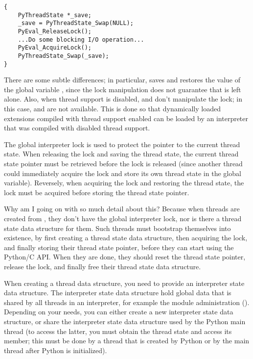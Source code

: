 \documentclass{manual}
\begin{document}
\begin{verbatim}
{
    PyThreadState *_save;
    _save = PyThreadState_Swap(NULL);
    PyEval_ReleaseLock();
    ...Do some blocking I/O operation...
    PyEval_AcquireLock();
    PyThreadState_Swap(_save);
}
\end{verbatim}

There are some subtle differences; in particular,
 saves and restores the value of the
global variable , since the lock manipulation does not
guarantee that  is left alone.  Also, when thread support
is disabled,  and
 don't manipulate the lock; in this
case,  and
 are not available.  This is done so
that dynamically loaded extensions compiled with thread support
enabled can be loaded by an interpreter that was compiled with
disabled thread support.

The global interpreter lock is used to protect the pointer to the
current thread state.  When releasing the lock and saving the thread
state, the current thread state pointer must be retrieved before the
lock is released (since another thread could immediately acquire the
lock and store its own thread state in the global variable).
Reversely, when acquiring the lock and restoring the thread state, the
lock must be acquired before storing the thread state pointer.

Why am I going on with so much detail about this?  Because when
threads are created from \C{}, they don't have the global interpreter
lock, nor is there a thread state data structure for them.  Such
threads must bootstrap themselves into existence, by first creating a
thread state data structure, then acquiring the lock, and finally
storing their thread state pointer, before they can start using the
Python/C API.  When they are done, they should reset the thread state
pointer, release the lock, and finally free their thread state data
structure.

When creating a thread data structure, you need to provide an
interpreter state data structure.  The interpreter state data
structure hold global data that is shared by all threads in an
interpreter, for example the module administration
().  Depending on your needs, you can either create
a new interpreter state data structure, or share the interpreter state
data structure used by the Python main thread (to access the latter,
you must obtain the thread state and access its  member;
this must be done by a thread that is created by Python or by the main
thread after Python is initialized).
\end{document}
